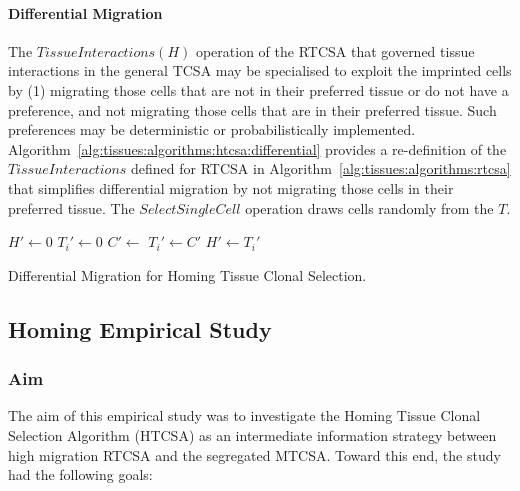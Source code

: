 \paragraph{Differential Migration}
The  $TissueInteractions(H)$ operation of the RTCSA that governed tissue interactions in the general TCSA may be specialised to exploit the imprinted cells by (1) migrating those cells that are not in their preferred tissue or do not have a preference, and not migrating those cells that are in their preferred tissue. Such preferences may be deterministic or probabilistically implemented. Algorithm~\ref{alg:tissues:algorithms:htcsa:differential} provides a re-definition of the $TissueInteractions$ defined for RTCSA in Algorithm~\ref{alg:tissues:algorithms:rtcsa} that simplifies differential migration by not migrating those cells in their preferred tissue. The $SelectSingleCell$ operation draws cells randomly from the $T$.

\begin{algorithm}[ht]
  \SetLine
  
	
	$H\prime \leftarrow 0$\;
	{
		$T_{i}\prime \leftarrow$0\;
		{
			$C\prime \leftarrow$ \;
			{
				$T_{i}\prime \leftarrow C\prime$\;
			}
		}
		$H\prime \leftarrow T_{i}\prime$\;
	}
	{
		{
			\;
		}
		\Else
		{
			\;
		}		
	}	
	\caption{Differential Migration for Homing Tissue Clonal Selection.}
	\label{alg:tissues:algorithms:htcsa:differential}
\end{algorithm}


%
%
\subsection{Homing Empirical Study}
\label{sec:tissues:homing:study}
%
%
\subsubsection{Aim}
The aim of this empirical study was to investigate the Homing Tissue Clonal Selection Algorithm (HTCSA) as an intermediate information strategy between high migration RTCSA and the segregated MTCSA. Toward this end, the study had the following goals:

